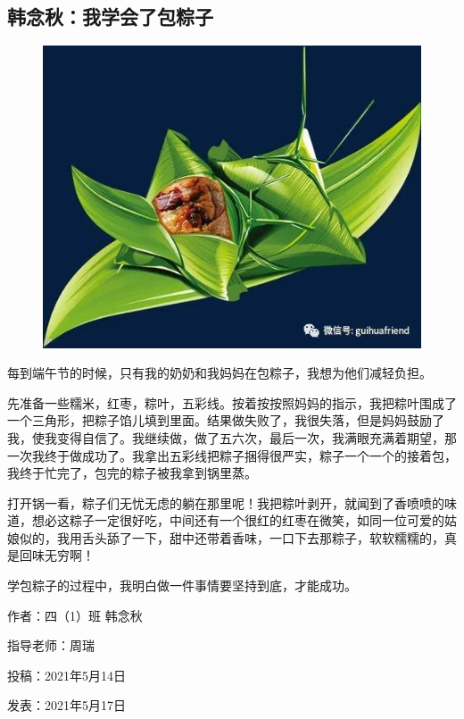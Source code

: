 \vspace{10pt}

{\centering\subsection*{韩念秋：我学会了包粽子}}


\renewcommand{\leftmark}{韩念秋：我学会了包粽子}

\begin{figure}[htbp]

\centering

\includegraphics[width = .5\textwidth]{./ch/23.jpg}

\end{figure}





每到端午节的时候，只有我的奶奶和我妈妈在包粽子，我想为他们减轻负担。

先准备一些糯米，红枣，粽叶，五彩线。按着按按照妈妈的指示，我把粽叶围成了一个三角形，把粽子馅儿填到里面。结果做失败了，我很失落，但是妈妈鼓励了我，使我变得自信了。我继续做，做了五六次，最后一次，我满眼充满着期望，那一次我终于做成功了。我拿出五彩线把粽子捆得很严实，粽子一个一个的接着包，我终于忙完了，包完的粽子被我拿到锅里蒸。

打开锅一看，粽子们无忧无虑的躺在那里呢！我把粽叶剥开，就闻到了香喷喷的味道，想必这粽子一定很好吃，中间还有一个很红的红枣在微笑，如同一位可爱的姑娘似的，我用舌头舔了一下，甜中还带着香味，一口下去那粽子，软软糯糯的，真是回味无穷啊！

学包粽子的过程中，我明白做一件事情要坚持到底，才能成功。





\vspace{10pt}



作者：四（1）班 韩念秋



指导老师：周瑞



投稿：2021年5月14日



发表：2021年5月17日














                



\vspace{10pt}

\hline



